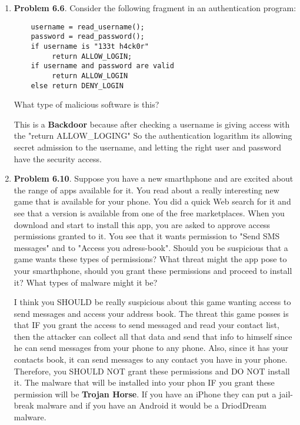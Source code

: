 \documentclass[12pt]{article}
\begin{document}
\begin{enumerate}
	
	
	\vspace{30pt}
	
	\item {\textbf{Problem 6.6}. Consider the following fragment in an authentication program: 	
	\begin{verbatim}
	username = read_username();
	password = read_password();
	if username is "133t h4ck0r"
	     return ALLOW_LOGIN;
	if username and password are valid 
	     return ALLOW_LOGIN
	else return DENY_LOGIN
	 \end{verbatim} What type of malicious software is this?}
	 
This is a \textbf{Backdoor}  because after checking a username is giving access with the  "return ALLOW\_LOGING"  So the authentication logarithm its allowing secret admission to the username, and letting the right user and password have the security access. \\
			
	
	\item {\textbf{Problem 6.10}. Suppose you have a new smarthphone and are excited about the range of apps available for it. You read about a really interesting new game that is available for your phone. You did a quick Web search for it and see that a version is available from one of the free marketplaces. When you download and start to install this app, you are asked to approve access permissions granted to it. You see that it wants permission to "Send SMS messages" and to "Access you adress-book". Should you be suspicious that a game wants these types of permissions? What threat might the app pose to your smarthphone, should you grant these permissions and proceed to install it? What types of malware might it be?} 
	
	I think you SHOULD be really suspicious about this game wanting access to send messages and access your address book. The threat this game posses is that IF you grant the access to send messaged and read your contact list, then the attacker can collect all that data and send that info to himself since he can send messages from your phone to any phone. Also, since it has your contacts book, it can send messages to any contact you have in your phone. Therefore, you SHOULD NOT grant these permissions and DO NOT install it. The malware that will be installed into your phon IF you grant these permission will be \textbf{Trojan Horse}. If you have an iPhone they can put a jail-break malware and if you have an Android it would be a DriodDream malware. 
	  


\end{enumerate}
\end{document}
